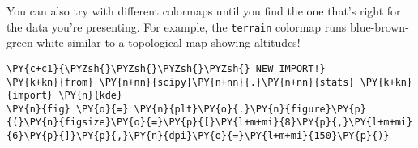     You can also try with different colormaps until you find the one that's
right for the data you're presenting. For example, the \texttt{terrain}
colormap runs blue-brown-green-white similar to a topological map
showing altitudes!

    \begin{tcolorbox}[breakable, size=fbox, boxrule=1pt, pad at break*=1mm,colback=cellbackground, colframe=cellborder]
\begin{Verbatim}[commandchars=\\\{\}]
\PY{c+c1}{\PYZsh{}\PYZsh{}\PYZsh{}\PYZsh{} NEW IMPORT!}
\PY{k+kn}{from} \PY{n+nn}{scipy}\PY{n+nn}{.}\PY{n+nn}{stats} \PY{k+kn}{import} \PY{n}{kde}
\PY{n}{fig} \PY{o}{=} \PY{n}{plt}\PY{o}{.}\PY{n}{figure}\PY{p}{(}\PY{n}{figsize}\PY{o}{=}\PY{p}{[}\PY{l+m+mi}{8}\PY{p}{,}\PY{l+m+mi}{6}\PY{p}{]}\PY{p}{,}\PY{n}{dpi}\PY{o}{=}\PY{l+m+mi}{150}\PY{p}{)} 


\end{Verbatim}
\end{tcolorbox}
